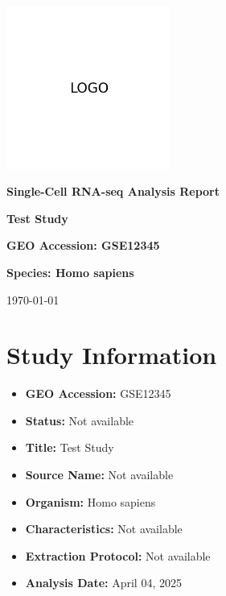 \documentclass[12pt]{article}
\begin{document}
\begin{titlepage}
    \centering
    \vspace*{2cm}

    \includegraphics[width=0.4\textwidth]{scagentic_logo.png}
    \vspace{1cm}

    \Huge\textbf{Single-Cell RNA-seq Analysis Report}
    \vspace{1cm}

    \Large\textbf{Test Study}
    \vspace{0.5cm}

    \Large\textbf{GEO Accession: GSE12345}
    \vspace{0.5cm}

    \Large\textbf{Species: Homo sapiens}
    \vspace{0.5cm}
    \vspace{1cm}

    \large\today
\end{titlepage}

\tableofcontents
\newpage

\section{Study Information}
\begin{itemize}
    \item \textbf{GEO Accession:} GSE12345
    \item \textbf{Status:} Not available
    \item \textbf{Title:} Test Study
    \item \textbf{Source Name:} Not available
    \item \textbf{Organism:} Homo sapiens
    \item \textbf{Characteristics:} Not available
    \item \textbf{Extraction Protocol:} Not available
    \item \textbf{Analysis Date:} {April 04, 2025}
\end{itemize}
\end{document}
